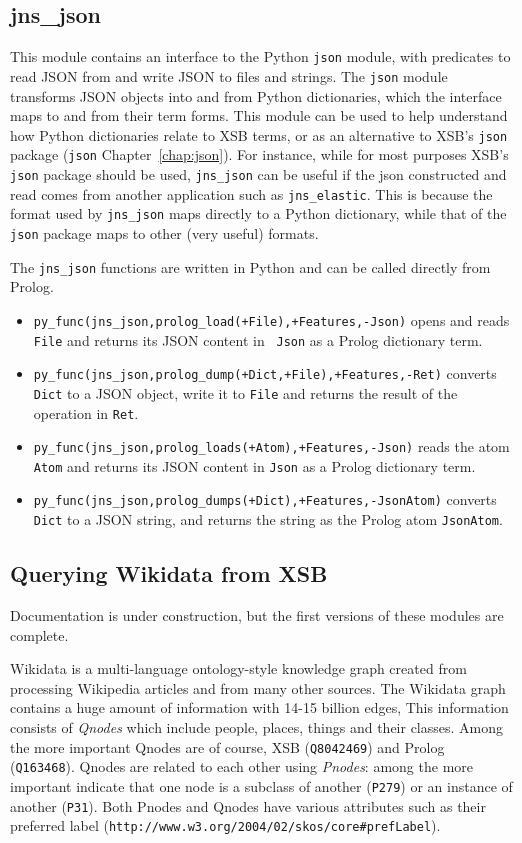 \subsection{jns\_json}
This module contains an interface to the Python {\tt json} module,
with predicates to read JSON from and write JSON to files and strings.
The {\tt json} module transforms JSON objects into and from Python
dictionaries, which the interface maps to and from their term forms.
This module can be used to help understand how Python dictionaries
relate to XSB terms, or as an alternative to XSB's {\tt json} package
({\tt json} Chapter~\ref{chap:json}).  For instance, while for most
purposes XSB's {\tt json} package should be used, {\tt jns\_json} can
be useful if the json constructed and read comes from another \janus{}
application such as {\tt jns\_elastic}.  This is because the format
used by {\tt jns\_json} maps directly to a Python dictionary, while
that of the {\tt json} package maps to other (very useful) formats.

The {\tt jns\_json} functions are written in Python and can be
called directly from Prolog.
\begin{itemize}
\item {\tt py\_func(jns\_json,prolog\_load(+File),+Features,-Json)}
  opens and reads {\tt File} and returns its JSON content in {\tt
    Json} as a Prolog dictionary term.
\item {\tt py\_func(jns\_json,prolog\_dump(+Dict,+File),+Features,-Ret)}
  converts {\tt Dict} to a JSON object, write it to {\tt File} and
  returns the result of the operation in {\tt Ret}.
\item {\tt py\_func(jns\_json,prolog\_loads(+Atom),+Features,-Json)}
  reads the atom {\tt Atom} and returns its JSON content in {\tt Json}
  as a Prolog dictionary term.
\item {\tt  py\_func(jns\_json,prolog\_dumps(+Dict),+Features,-JsonAtom)}
  converts {\tt Dict} to a JSON string, and returns the string as the
  Prolog atom {\tt JsonAtom}.
\end{itemize}  

\subsection{Querying Wikidata from XSB}
%
{\sc Documentation is under construction, but the first versions of
  these modules are complete.}

Wikidata is a multi-language ontology-style knowledge graph created
from processing Wikipedia articles and from many other sources.  The
Wikidata graph contains a huge amount of information with 14-15
billion edges, This information consists of {\em Qnodes} which include
people, places, things and their classes.  Among the more important
Qnodes are of course, XSB ({\tt Q8042469}) and Prolog ({\tt Q163468}).
Qnodes are related to each other using {\em Pnodes}: among the more
important indicate that one node is a subclass of another ({\tt P279})
or an instance of another ({\tt P31}).  Both Pnodes and Qnodes have
various attributes such as their preferred label
(\verb|http://www.w3.org/2004/02/skos/core#prefLabel|).

